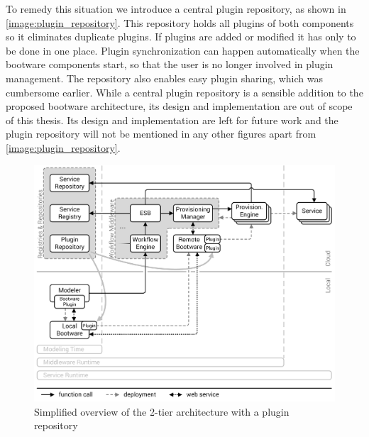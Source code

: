 To remedy this situation we introduce a central plugin repository, as shown in \autoref{image:plugin_repository}.
This repository holds all plugins of both components so it eliminates duplicate plugins.
If plugins are added or modified it has only to be done in one place.
Plugin synchronization can happen automatically when the bootware components start, so that the user is no longer involved in plugin management.
The repository also enables easy plugin sharing, which was cumbersome earlier.
While a central plugin repository is a sensible addition to the proposed bootware architecture, its design and implementation are out of scope of this thesis.
Its design and implementation are left for future work and the plugin repository will not be mentioned in any other figures apart from \autoref{image:plugin_repository}.

\begin{figure}[!htbp]
	\centering
	\includegraphics[resolution=600]{design/assets/plugin_repository}
	\caption{Simplified overview of the 2-tier architecture with a plugin repository}
	\label{image:plugin_repository}
\end{figure}
